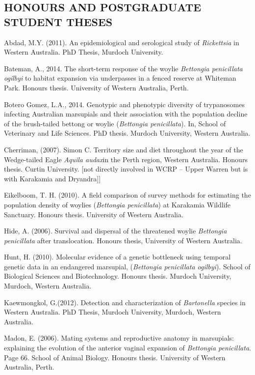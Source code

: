 \documentclass[version=last,
    paper=a4,                               %
    10pt,                                   %
    dvipsnames,
    oneside,                              %
    headings=openany,                       %
    open=any,
    BCOR=7mm,                               %
    DIV=15,     %
]{scrbook}
\begin{document}
\subsection{HONOURS AND POSTGRADUATE STUDENT THESES}

Abdad, M.Y. (2011). An epidemiological and serological study of
\emph{Rickettsia} in Western Australia. PhD Thesis, Murdoch University.

Bateman, A., 2014. The short-term response of the woylie \emph{Bettongia
penicillata} \emph{ogilbyi} to habitat expansion via underpasses in a
fenced reserve at Whiteman Park. Honours thesis. University of Western
Australia, Perth.

Botero Gomez, L.A., 2014. Genotypic and phenotypic diversity of
trypanosomes infecting Australian marsupials and their association with
the population decline of the brush-tailed bettong or woylie
(\emph{Bettongia penicillata}). In, School of Veterinary and Life
Sciences. PhD thesis. Murdoch University, Western Australia.

Cherriman, (2007). Simon C. Territory size and diet throughout the year
of the Wedge-tailed Eagle \emph{Aquila audax}in the Perth region,
Western Australia. Honours thesis. Curtin University. {[}not directly
involved in WCRP -- Upper Warren but is with Karakamia and
Dryandra{]}{]}

Eikelboom, T. H. (2010). A field comparison of survey methods for
estimating the population density of woylies (\emph{Bettongia
penicillata}) at Karakamia Wildlife Sanctuary. Honours thesis.
University of Western Australia.

Hide, A. (2006). Survival and dispersal of the threatened woylie
\emph{Bettongia penicillata} after translocation. Honours thesis,
University of Western Australia.

Hunt, H. (2010). Molecular evidence of a genetic bottleneck using
temporal genetic data in an endangered marsupial, (\emph{Bettongia
penicillata ogilbyi}). School of Biological Sciences and Biotechnology.
Honours thesis. Murdoch University, Murdoch, Western Australia.

Kaewmongkol, G.(2012). Detection and characterization of
\emph{Bartonella} species in Western Australia. PhD Thesis, Murdoch
University, Murdoch, Western Australia.

Madon, E. (2006). Mating systems and reproductive anatomy in marsupials:
explaining the evolution of the anterior vaginal expansion of
\emph{Bettongia penicillata}. Page 66. School of Animal Biology. Honours
thesis. University of Western Australia, Perth.
\end{document}
